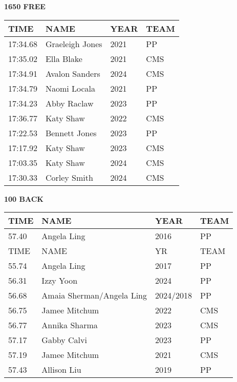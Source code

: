 \vspace{0.4cm}

\begin{minipage}[t]{0.48\textwidth}
\centering
\textbf{1650 FREE}\\[0.05cm]
\begin{tabular}{@{}p{1.8cm}p{2.8cm}p{1.2cm}p{1.4cm}@{}}
\hline
\textbf{TIME} & \textbf{NAME} & \textbf{YEAR} & \textbf{TEAM} \\
\hline
17:34.68 & Graeleigh Jones & 2021 & PP \\
17:35.02 & Ella Blake & 2021 & CMS \\
17:34.91 & Avalon Sanders & 2024 & CMS \\
17:34.79 & Naomi Locala & 2021 & PP \\
17:34.23 & Abby Raclaw & 2023 & PP \\
17:36.77 & Katy Shaw & 2022 & CMS \\
17:22.53 & Bennett Jones & 2023 & PP \\
17:17.92 & Katy Shaw & 2023 & CMS \\
17:03.35 & Katy Shaw & 2024 & CMS \\
17:30.33 & Corley Smith & 2024 & CMS \\
\hline
\end{tabular}
\end{minipage}\hfill
\begin{minipage}[t]{0.48\textwidth}
\centering
\textbf{100 BACK}\\[0.05cm]
\begin{tabular}{@{}p{1.8cm}p{2.8cm}p{1.2cm}p{1.4cm}@{}}
\hline
\textbf{TIME} & \textbf{NAME} & \textbf{YEAR} & \textbf{TEAM} \\
\hline
57.40 & Angela Ling & 2016 & PP \\
 TIME &   NAME & YR & TEAM \\
55.74 & Angela Ling & 2017 & PP \\
56.31 & Izzy Yoon & 2024 & PP \\
56.68 & Amaia Sherman/Angela Ling & 2024/2018 & PP \\
56.75 & Jamee Mitchum & 2022 & CMS \\
56.77 & Annika Sharma & 2023 & CMS \\
57.17 & Gabby Calvi & 2023 & PP \\
57.19 & Jamee Mitchum & 2021 & CMS \\
57.43 & Allison Liu & 2019 & PP \\
\hline
\end{tabular}
\end{minipage}

